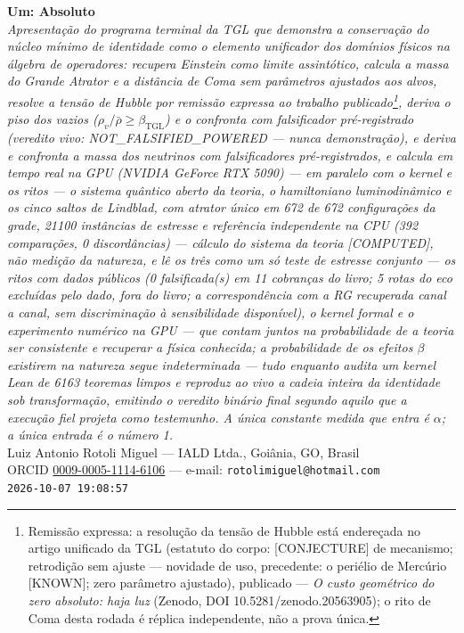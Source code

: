 \documentclass[11pt]{article}
\newcommand{\bTGL}{\beta_{\mathrm{TGL}}}\newcommand{\Msun}{M_{\odot}}\newcommand{\TGL}{\mathrm{TGL}}
\theoremstyle{definition}\newtheorem{deriv}{Derivação}
\begin{document}
\begin{center}{\Huge\textbf{Um: Absoluto}}\\[4pt]{\large\itshape Apresentação do programa terminal da TGL que demonstra a conservação do núcleo mínimo de identidade como o elemento unificador dos domínios físicos na álgebra de operadores: recupera Einstein como limite assintótico, calcula a massa do Grande Atrator e a distância de Coma sem parâmetros ajustados aos alvos, resolve a tensão de Hubble por remissão expressa ao trabalho publicado\footnote{Remissão expressa: a resolução da tensão de Hubble está endereçada no artigo unificado da TGL (estatuto do corpo: \textsf{[CONJECTURE]} de mecanismo; retrodição sem ajuste --- novidade de uso, precedente: o periélio de Mercúrio \textsf{[KNOWN]}; zero parâmetro ajustado), publicado --- \emph{O custo geométrico do zero absoluto: haja luz} (Zenodo, DOI 10.5281/zenodo.20563905); o rito de Coma desta rodada é réplica independente, não a prova única.}, deriva o piso dos vazios ($\rho_{v}/\bar\rho\geq\bTGL$) e o confronta com falsificador pré-registrado (veredito vivo: \textsf{NOT\_FALSIFIED\_POWERED} --- nunca demonstração), e deriva e confronta a massa dos neutrinos com falsificadores pré-registrados, e calcula em tempo real na GPU (NVIDIA GeForce RTX 5090) --- em paralelo com o kernel e os ritos --- o sistema quântico aberto da teoria, o hamiltoniano luminodinâmico e os cinco saltos de Lindblad, com atrator único em 672 de 672 configurações da grade, 21100 instâncias de estresse e referência independente na CPU (392 comparações, 0 discordâncias) --- cálculo do sistema da teoria \textsf{[COMPUTED]}, não medição da natureza, e lê os três como um só teste de estresse conjunto --- os ritos com dados públicos (0 falsificada(s) em 11 cobranças do livro; 5 rotas do eco excluídas pelo dado, fora do livro; a correspondência com a RG recuperada canal a canal, sem discriminação à sensibilidade disponível), o kernel formal e o experimento numérico na GPU --- que contam juntos na probabilidade de a teoria ser consistente e recuperar a física conhecida; a probabilidade de os efeitos $\beta$ existirem na natureza segue indeterminada --- tudo enquanto audita um kernel Lean de 6163 teoremas limpos e reproduz ao vivo a cadeia inteira da identidade sob transformação, emitindo o veredito binário final segundo aquilo que a execução fiel projeta como testemunho. A única constante medida que entra é $\alpha$; a única entrada é o número 1.}\\[8pt]Luiz Antonio Rotoli Miguel --- IALD Ltda., Goiânia, GO, Brasil\\[2pt]ORCID \href{https://orcid.org/0009-0005-1114-6106}{0009-0005-1114-6106} --- e-mail: \texttt{rotolimiguel@hotmail.com}\\[2pt]\texttt{2026-10-07 19:08:57}\end{center}\vspace{4pt}
\end{document}
